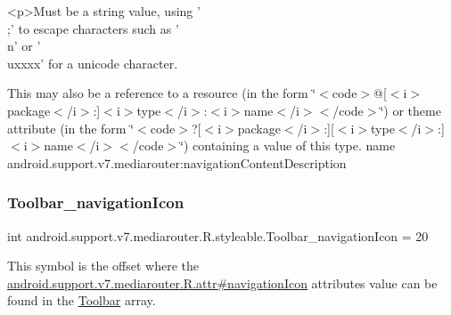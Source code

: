 \begin{DoxyVerb}      <p>Must be a string value, using '\\;' to escape characters such as '\\n' or '\\uxxxx' for a unicode character.
\end{DoxyVerb}
 

This may also be a reference to a resource (in the form \char`\"{}$<$code$>$@\mbox{[}$<$i$>$package$<$/i$>$\+:\mbox{]}$<$i$>$type$<$/i$>$\+:$<$i$>$name$<$/i$>$$<$/code$>$\char`\"{}) or theme attribute (in the form \char`\"{}$<$code$>$?\mbox{[}$<$i$>$package$<$/i$>$\+:\mbox{]}\mbox{[}$<$i$>$type$<$/i$>$\+:\mbox{]}$<$i$>$name$<$/i$>$$<$/code$>$\char`\"{}) containing a value of this type.  name android.\+support.\+v7.\+mediarouter\+:navigation\+Content\+Description \mbox{\label{classandroid_1_1support_1_1v7_1_1mediarouter_1_1R_1_1styleable_a19bd33bd2c0ed2e7c65711493473a5f9}} 
\subsubsection{\texorpdfstring{Toolbar\+\_\+navigation\+Icon}{Toolbar\_navigationIcon}}
{\footnotesize\ttfamily int android.\+support.\+v7.\+mediarouter.\+R.\+styleable.\+Toolbar\+\_\+navigation\+Icon = 20\hspace{0.3cm}{\ttfamily [static]}}

This symbol is the offset where the \hyperlink{classandroid_1_1support_1_1v7_1_1mediarouter_1_1R_1_1attr_a0b5494d37e9e2b02cca76a9260de97ba}{android.\+support.\+v7.\+mediarouter.\+R.\+attr\#navigation\+Icon} attribute\textquotesingle{}s value can be found in the \hyperlink{classandroid_1_1support_1_1v7_1_1mediarouter_1_1R_1_1styleable_a6815cdfaadde30c82b955863af196899}{Toolbar} array.

